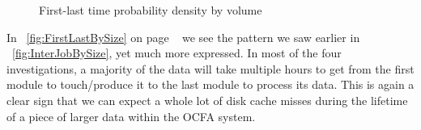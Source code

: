 \begin{figure}
{}
\caption{First-last time probability density by volume}
\label{fig:FirstLastiBySize}
\end{figure}

In ~\ref{fig:FirstLastBySize} on page ~\pageref{fig:FirstLastBySize} we see the pattern we saw earlier in ~\ref{fig:InterJobBySize}, yet much more expressed. In most of the four investigations, a majority of the data will take multiple hours to get from the first module to touch/produce it to the last module to process its data. This is again a clear sign that we can expect a whole lot of disk cache misses during the lifetime of a piece of larger data within the OCFA system.
